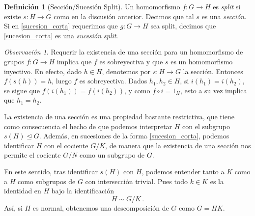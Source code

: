 \documentclass[a4paper,11pt]{amsart}
\theoremstyle{plain}
\theoremstyle{definition}
\newtheorem{defi}[thm]{Definición}
\theoremstyle{remark}
\newtheorem*{rem}{Observación}
\begin{document}
\begin{defi}[Sección/Sucesión Split]
Un homomorfismo $f \colon G \to H$ es \textit{split} si existe $s \colon H \to G$ como en la discusión anterior. Decimos que tal $s$ es una \textit{sección}. Si en \eqref{sucesion_corta} requerimos que $g \colon G \to H$ sea split, decimos que \eqref{sucesion_corta} es una \textit{sucesión split}.
\end{defi}

\begin{rem}
Requerir la existencia de una sección para un homomorfismo de grupos $f \colon G \to H$ implica que $f$ es sobreyectiva y que $s$ es un homomorfismo inyectivo. En efecto, dado $h \in H$, denotemos por $s \colon H \to G$ la sección. Entonces $f(s(h)) = h$, luego $f$ es sobreyectiva. Dados $h_1, h_2 \in H$, si $i(h_1) = i(h_2)$, se sigue que $f(i(h_1)) = f(i(h_2))$, y como $f \circ i = 1_H$, esto a su vez implica que $h_1 = h_2$. 
\end{rem}

La existencia de una sección es una propiedad bastante restrictiva, que tiene como consecuencia el hecho de que podemos interpretar $H$ con el subgrupo $s(H) \unlhd G$. Además, en sucesiones de la forma \eqref{sucesion_corta}, podemos identificar $H$ con el cociente $G/K$, de manera que la existencia de una sección nos permite  el cociente $G/N$ como un subgrupo de $G$. 


En este sentido, tras identificar $s(H)$ con $H$, podemos entender tanto a $K$ como a $H$ como subgrupos de $G$ con intersección trivial. Pues todo $k \in K$ es la identidad en $H$ bajo la identificación 
\[ H \sim G/K \, . \]
Así, si $H$ es normal, obtenemos una descomposición de $G$ como $G = HK$.
\end{document}
